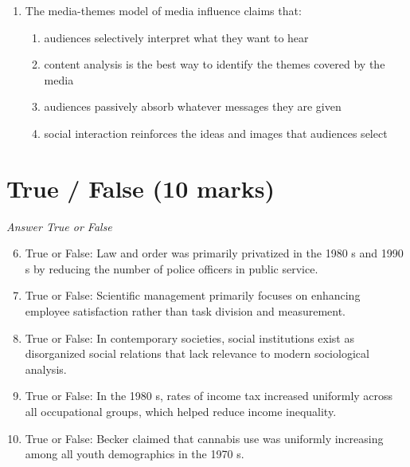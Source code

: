 \documentclass[12pt]{article}
\begin{document}
\begin{enumerate}[label=\arabic*.]
\begin{enumerate}[label=(\alph*)]
    \item A preschool provider
    \item A peer group
    \item The mass media
    \item The family
\end{enumerate}
\item The media-themes model of media influence claims that:
\begin{enumerate}[label=(\alph*)]
    \item audiences selectively interpret what they want to hear
    \item content analysis is the best way to identify the themes covered by the media
    \item audiences passively absorb whatever messages they are given
    \item social interaction reinforces the ideas and images that audiences select
\end{enumerate}
\end{enumerate}

\section*{True / False (10 marks)}
\textit{Answer True or False}
\begin{enumerate}[label=\arabic*.]
\setcounter{enumi}{5}
\item True or False: Law and order was primarily privatized in the 1980 s and 1990 s by reducing the number of police officers in public service.
\item True or False: Scientific management primarily focuses on enhancing employee satisfaction rather than task division and measurement.
\item True or False: In contemporary societies, social institutions exist as disorganized social relations that lack relevance to modern sociological analysis.
\item True or False: In the 1980 s, rates of income tax increased uniformly across all occupational groups, which helped reduce income inequality.
\item True or False: Becker claimed that cannabis use was uniformly increasing among all youth demographics in the 1970 s.
\end{enumerate}
\end{document}
